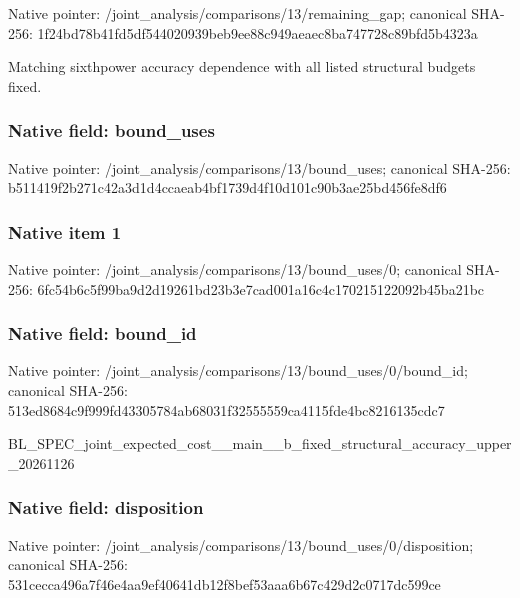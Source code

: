\documentclass[10pt,a4paper]{article}
\begin{document}
Native pointer: /joint\_analysis/comparis\allowbreak{}ons/13/remaining\_gap; canonical SHA-256: 1f24bd78b41fd5df54402093\allowbreak{}9beb9ee88c949aeaec8ba747\allowbreak{}728c89bfd5b4323a


Matching sixthpower accuracy dependence with all listed structural budgets fixed.


\subsubsection{Native field: bound\_uses}


Native pointer: /joint\_analysis/comparis\allowbreak{}ons/13/bound\_uses; canonical SHA-256: b511419f2b271c42a3d1d4cc\allowbreak{}aeab4bf1739d4f10d101c90b\allowbreak{}3ae25bd456fe8df6



\subsubsection{Native item 1}


Native pointer: /joint\_analysis/comparis\allowbreak{}ons/13/bound\_uses/0; canonical SHA-256: 6fc54b6c5f99ba9d2d19261b\allowbreak{}d23b3e7cad001a16c4c17021\allowbreak{}5122092b45ba21bc



\subsubsection{Native field: bound\_id}


Native pointer: /joint\_analysis/comparis\allowbreak{}ons/13/bound\_uses/0/boun\allowbreak{}d\_id; canonical SHA-256: 513ed8684c9f999fd4330578\allowbreak{}4ab68031f32555559ca4115f\allowbreak{}de4bc8216135cdc7


BL\_SPEC\_joint\_expected\_c\allowbreak{}ost\_\_main\_\_b\_fixed\_struc\allowbreak{}tural\_accuracy\_upper\_202\allowbreak{}61126


\subsubsection{Native field: disposition}


Native pointer: /joint\_analysis/comparis\allowbreak{}ons/13/bound\_uses/0/disp\allowbreak{}osition; canonical SHA-256: 531cecca496a7f46e4aa9ef4\allowbreak{}0641db12f8bef53aaa6b67c4\allowbreak{}29d2c0717dc599ce
\end{document}
